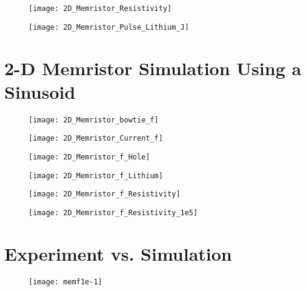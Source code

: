 \begin{figure}[!htp]
\centering
\texttt{[image: 2D\_Memristor\_Resistivity]}
\caption{} 
\label{}
\end{figure}



\begin{figure}[!htp]
\centering
\texttt{[image: 2D\_Memristor\_Pulse\_Lithium\_J]}
\caption{} 
\label{}
\end{figure}


\clearpage
\section{2-D Memristor Simulation Using a Sinusoid}

\begin{figure}[!htp]
\centering
\texttt{[image: 2D\_Memristor\_bowtie\_f]}
\caption{} 
\label{}
\end{figure}


\begin{figure}[!htp]
\centering
\texttt{[image: 2D\_Memristor\_Current\_f]}
\caption{} 
\label{}
\end{figure}

\begin{figure}[!htp]
\centering
\texttt{[image: 2D\_Memristor\_f\_Hole]}
\caption{} 
\label{}
\end{figure}

\begin{figure}[!htp]
\centering
\texttt{[image: 2D\_Memristor\_f\_Lithium]}
\caption{} 
\label{}
\end{figure}

\begin{figure}[!htp]
\centering
\texttt{[image: 2D\_Memristor\_f\_Resistivity]}
\caption{} 
\label{}
\end{figure}


\begin{figure}[!htp]
\centering
\texttt{[image: 2D\_Memristor\_f\_Resistivity\_1e5]}
\caption{} 
\label{}
\end{figure}

\clearpage
\section{Experiment vs. Simulation}


\begin{figure}[!htp]
\centering
\texttt{[image: memf1e-1]}
\caption{} 
\label{}
\end{figure}


